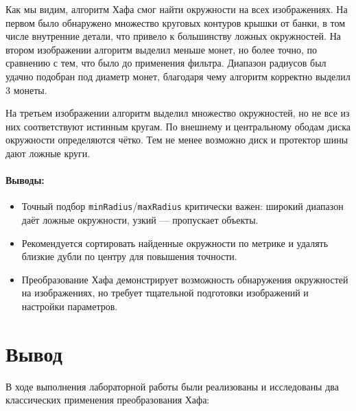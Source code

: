 \documentclass[a4paper,12pt]{article}
\begin{document}
\noindent Как мы видим, алгоритм Хафа смог найти окружности на всех изображениях. На первом было обнаружено множество круговых контуров крышки от банки, в том числе внутренние детали, что привело к большинству ложных окружностей. На втором изображении алгоритм выделил меньше монет, но более точно, по сравнению с тем, что было до применения фильтра. Диапазон радиусов был удачно подобран под диаметр монет, благодаря чему алгоритм корректно выделил 3 монеты. 

На третьем изображении алгоритм выделил множество окружностей, но не все из них соответствуют истинным кругам. По внешнему и центральному ободам диска окружности определяются чётко. Тем не менее возможно диск и протектор шины дают ложные круги. 
\paragraph{Выводы:}
\begin{itemize}
    \item Точный подбор \texttt{minRadius}/\texttt{maxRadius} критически важен: широкий диапазон даёт ложные окружности, узкий --- пропускает объекты.
    \item Рекомендуется сортировать найденные окружности по метрике и удалять близкие дубли по центру для повышения точности.
    \item Преобразование Хафа демонстрирует возможность обнаружения окружностей на изображениях, но требует тщательной подготовки изображений и настройки параметров.
\end{itemize}

\section{Вывод}
В ходе выполнения лабораторной работы были реализованы и исследованы два классических применения преобразования Хафа:
\end{document}
